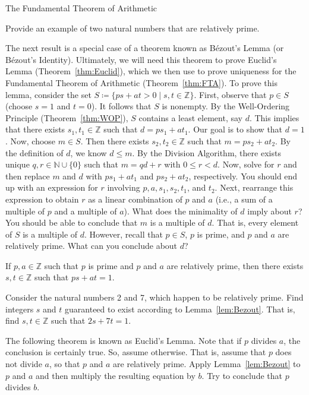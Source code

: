 \begin{section}{The Fundamental Theorem of Arithmetic}
\begin{problem}
Provide an example of two natural numbers that are relatively prime.
\end{problem}

The next result is a special case of a theorem known as B\'ezout's Lemma (or B\'ezout's Identity). Ultimately, we will need this theorem to prove Euclid's Lemma (Theorem~\ref{thm:Euclid}), which we then use to prove uniqueness for the Fundamental Theorem of Arithmetic (Theorem~\ref{thm:FTA}). To prove this lemma, consider the set $S\coloneqq \{ps+at> 0\mid s,t\in \mathbb{Z}\}$. First, observe that $p\in S$ (choose $s=1$ and $t=0$). It follows that $S$ is nonempty. By the Well-Ordering Principle (Theorem~\ref{thm:WOP}), $S$ contains a least element, say $d$. This implies that there exists $s_1,t_1\in \mathbb{Z}$ such that $d=ps_1+at_1$. Our goal is to show that $d=1$. Now, choose $m\in S$. Then there exists $s_2,t_2\in \mathbb{Z}$ such that $m=ps_2+at_2$. By the definition of $d$, we know $d\leq m$. By the Division Algorithm, there exists unique $q,r\in \mathbb{N}\cup\{0\}$ such that $m=qd+r$ with $0\leq r < d$. Now, solve for $r$ and then replace $m$ and $d$ with $ps_1+at_1$ and $ps_2+at_2$, respectively.  You should end up with an expression for $r$ involving $p, a, s_1, s_2, t_1$, and $t_2$.  Next, rearrange this expression to obtain $r$ as a linear combination of $p$ and $a$ (i.e., a sum of a multiple of $p$ and a multiple of $a$). What does the minimality of $d$ imply about $r$?  You should be able to conclude that $m$ is a multiple of $d$.  That is, every element of $S$ is a multiple of $d$.  However, recall that $p\in S$, $p$ is prime, and $p$ and $a$ are relatively prime.  What can you conclude about $d$?

\begin{lemma}\label{lem:Bezout}
If $p,a\in\mathbb{Z}$ such that $p$ is prime and $p$ and $a$ are relatively prime, then there exists $s,t\in\mathbb{Z}$ such that $ps+at=1$.
\end{lemma}

\begin{problem}
Consider the natural numbers 2 and 7, which happen to be relatively prime.  Find integers $s$ and $t$ guaranteed to exist according to Lemma~\ref{lem:Bezout}.  That is, find $s,t\in\mathbb{Z}$ such that $2s+7t=1$.
\end{problem}

The following theorem is known as Euclid's Lemma. Note that if $p$ divides $a$, the conclusion is certainly true.  So, assume otherwise.  That is, assume that $p$ does not divide $a$, so that $p$ and $a$ are relatively prime.  Apply Lemma~\ref{lem:Bezout} to $p$ and $a$ and then multiply the resulting equation by $b$. Try to conclude that $p$ divides $b$.


\end{section}
